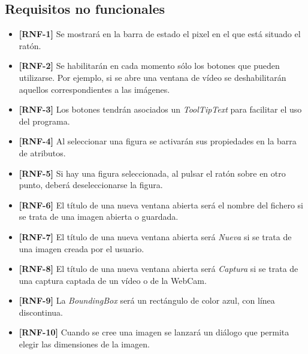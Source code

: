 \subsection{Requisitos no funcionales}
\begin{itemize}
\item{\textbf{[RNF-1]} Se mostrará en la barra de estado el pixel en el que está situado el ratón.}
\item{\textbf{[RNF-2]} Se habilitarán en cada momento sólo los botones que pueden utilizarse. Por ejemplo, si se abre una ventana de vídeo se deshabilitarán aquellos correspondientes a las imágenes.}
\item{\textbf{[RNF-3]} Los botones tendrán asociados un \textit{ToolTipText} para facilitar el uso del programa.}
\item{\textbf{[RNF-4]} Al seleccionar una figura se activarán sus propiedades en la barra de atributos.}
\item{\textbf{[RNF-5]} Si hay una figura seleccionada, al pulsar el ratón sobre en otro punto, deberá deseleccionarse la figura.}
\item{\textbf{[RNF-6]} El título de una nueva ventana abierta será el nombre del fichero si se trata de una imagen abierta o guardada.}
\item{\textbf{[RNF-7]} El título de una nueva ventana abierta será \textit{Nueva} si se trata de una imagen creada por el usuario.}
\item{\textbf{[RNF-8]} El título de una nueva ventana abierta será \textit{Captura} si se trata de una captura captada de un vídeo o de la WebCam.}
\item{\textbf{[RNF-9]} La \textit{BoundingBox} será un rectángulo de color azul, con línea discontinua.}
\item{\textbf{[RNF-10]} Cuando se cree una imagen se lanzará un diálogo que permita elegir las dimensiones de la imagen.}

\end{itemize}

\clearpage


